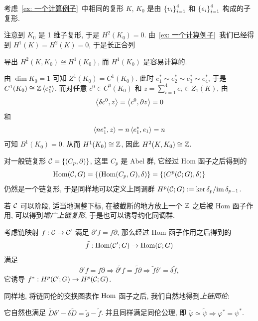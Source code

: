 \begin{Example}
	考虑~\ref{ex: 一个计算例子}~中相同的复形 $ K $, $ K_0 $ 是由 $ \left\{ v_i \right\}_{i=1}^4 $ 和 $ \left\{ e_i \right\}_{i=1}^4 $ 构成的子复形.

	注意到 $ K_0 $ 是 1 维子复形, 于是 $ H^2(K_0)=0 $. 由~\ref{ex: 一个计算例子}~我们已经得到 $ H^1(K)=H^2(K)=0 $, 于是长正合列
	\begin{center}
	\end{center}
	导出 $ H^2(K,K_0)\cong H^1(K_0) $, 而 $ H^1(K_0) $ 是容易计算的.

	由 $ \dim K_0=1 $ 可知 $ Z^1(K_0)=C^1(K_0) $. 此时 $ e_1^*\sim e_2^*\sim e_3^*\sim e_4^* $, 于是 $ C^1(K_0)\cong\mathbb{Z}\left\langle e_1^* \right\rangle $. 而对任意 $ c^0\in C^0(K_0) $ 和 $ z=\sum_{i=1}^4e_i\in Z_1(K) $, 由
	\[
		\left\langle \delta c^0,z \right\rangle=\left\langle c^0,\partial z \right\rangle=0
	\]
	和
	\[
		\left\langle ne_1^*,z \right\rangle=n\left\langle e_1^*,e_1 \right\rangle=n
	\]
	可知 $ B^1(K_0)=0 $. 从而 $ H^1(K_0)\cong\mathbb{Z} $, 因此 $ H^2(K,K_0)\cong\mathbb{Z} $.
\end{Example}

对一般链复形 $ \mathcal{C}=\left\{ (C_p,\partial) \right\} $, 这里 $ C_p $ 是 Abel 群, 它经过 Hom 函子之后得到的
\[
	\mathrm{Hom}(\mathcal{C},G)=\left\{ (\mathrm{Hom}(C_p,G),\delta) \right\}=\left\{ (C^p(\mathcal{C};G),\delta) \right\}
\]
仍然是一个链复形, 于是同样地可以定义上同调群 $ H^p(\mathcal{C};G):=\ker\delta_p/\mathrm{im}\,\delta_{p-1} $.

若 $ \mathcal{C} $ 可以阶段, 适当地调整下标, 在被截断的地方放上一个 $ \mathbb{Z} $ 之后被 Hom 函子作用, 可以得到\emph{增广上链复形}, 于是也可以诱导约化同调群.

考虑链映射 $ f : \mathcal{C}\to\mathcal{C}' $ 满足 $ \partial'f=f\partial $, 那么经过 Hom 函子作用之后得到的
\[
	\tilde{f} : \mathrm{Hom}(\mathcal{C}';G)\to\mathrm{Hom}(\mathcal{C};G)
\]
满足
\[
	\partial'f=f\partial\Longrightarrow\widetilde{\partial'f}=\widetilde{f\partial}\Longrightarrow\tilde{f}\delta'=\delta\tilde{f},
\]
它诱导 $ f^* : H^p(\mathcal{C}';G)\to H^p(\mathcal{C};G) $.

同样地, 将链同伦的交换图表作 $ \mathrm{Hom} $ 函子之后, 我们自然地得到\emph{上链同伦}:
\begin{center}
\end{center}
它自然也满足 $ \tilde{D}\delta'-\delta\tilde{D}=\tilde g-\tilde f $. 并且同样满足同伦公理, 即 $ \tilde\varphi\simeq\tilde\psi\Longrightarrow\varphi^*=\psi^* $.

